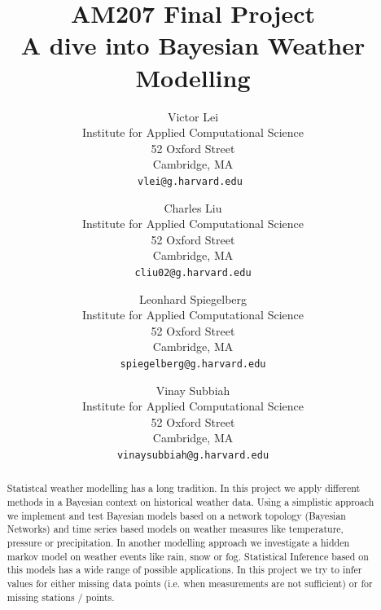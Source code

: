 \documentclass{article}
\makeatletter
\newcommand*{\toccontents}{\@starttoc{toc}}
\makeatother
\begin{document}
\title{\Huge AM207 Final Project \\ \Large A dive into Bayesian Weather Modelling}
\singlespacing
\author{
  Victor Lei\\
           \small Institute for Applied Computational Science\\
	\small 52 Oxford Street\\
	\small Cambridge, MA\\
  \texttt{vlei@g.harvard.edu }
  \and
   Charles Liu\\
           \small Institute for Applied Computational Science\\
	\small 52 Oxford Street\\
	\small Cambridge, MA\\
  \texttt{cliu02@g.harvard.edu}
  \and
  Leonhard Spiegelberg\\
         \small Institute for Applied Computational Science\\
	\small 52 Oxford Street\\
	\small Cambridge, MA\\
 \texttt{spiegelberg@g.harvard.edu}
 \and
   Vinay Subbiah\\
         \small Institute for Applied Computational Science\\
	\small 52 Oxford Street\\
	\small Cambridge, MA\\
 \texttt{vinaysubbiah@g.harvard.edu}
}
\maketitle
\doublespacing
\begin{abstract}
Statistcal weather modelling has a long tradition. In this project we apply different methods in a Bayesian context on historical weather data. Using a simplistic approach we implement and test Bayesian models based on a network topology (Bayesian Networks) and time series based models on weather measures like temperature, pressure or precipitation. In another modelling approach we investigate a hidden markov model on weather events like rain, snow or fog. Statistical Inference based on this models has a wide range of possible applications. In this project we try to infer values for either missing data points (i.e. when measurements are not sufficient) or for missing stations / points.
\end{abstract}

\vfill
\singlespacing
\begin{center}
\bfseries\contentsname
\end{center}
\toccontents
\clearpage
\end{document}
